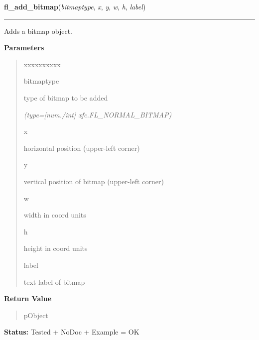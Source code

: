     \label{xformslib:library:fl_add_bitmap}

    \vspace{0.5ex}

\hspace{.8\funcindent}\begin{boxedminipage}{\funcwidth}

    \raggedright \textbf{fl\_add\_bitmap}(\textit{bitmaptype}, \textit{x}, \textit{y}, \textit{w}, \textit{h}, \textit{label})

    \vspace{-1.5ex}

    \rule{\textwidth}{0.5\fboxrule}
\setlength{\parskip}{2ex}
    Adds a bitmap object.

\setlength{\parskip}{1ex}
      \textbf{Parameters}
      \vspace{-1ex}

      \begin{quote}
        \begin{Ventry}{xxxxxxxxxx}

          \item[bitmaptype]

          type of bitmap to be added

            {\it (type=[num./int] xfc.FL\_NORMAL\_BITMAP)}

          \item[x]

          horizontal position (upper-left corner)

          \item[y]

          vertical position of bitmap (upper-left corner)

          \item[w]

          width in coord units

          \item[h]

          height in coord units

          \item[label]

          text label of bitmap

        \end{Ventry}

      \end{quote}

      \textbf{Return Value}
    \vspace{-1ex}

      \begin{quote}
      pObject

      \end{quote}

\textbf{Status:} Tested + NoDoc + Example = OK



    \end{boxedminipage}


